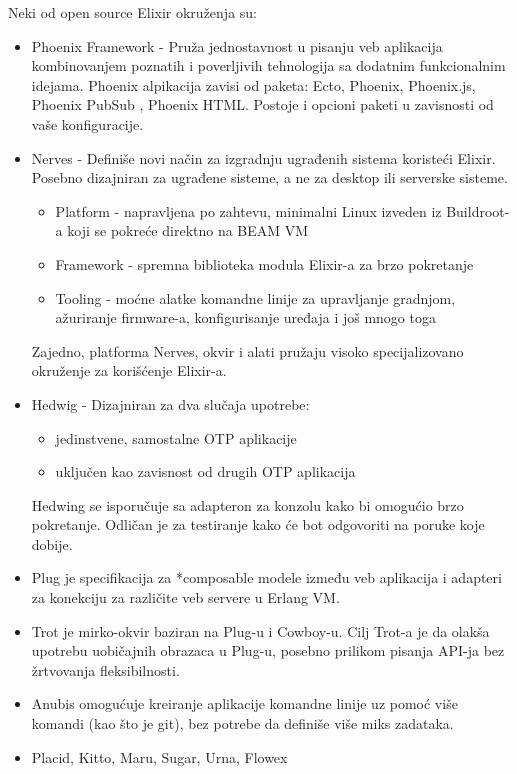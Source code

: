 \documentclass[a4paper]{article}
\begin{document}
Neki od open source Elixir okruženja su:
\begin{itemize}
    \item Phoenix Framework - Pruža jednostavnost u pisanju veb aplikacija kombinovanjem poznatih i poverljivih tehnologija sa dodatnim funkcionalnim idejama. Phoenix alpikacija zavisi od paketa: Ecto, Phoenix, Phoenix.js, Phoenix PubSub , Phoenix HTML. Postoje i opcioni paketi u zavisnosti od vaše konfiguracije.

    \item Nerves - Definiše novi način za izgradnju ugrađenih sistema koristeći Elixir. Posebno dizajniran za ugrađene sisteme, a ne za desktop ili serverske sisteme. 
    \begin{itemize}
        \item Platform - napravljena po zahtevu, minimalni Linux izveden iz Buildroot-a koji se pokreće direktno na BEAM VM
        \item Framework - spremna biblioteka modula Elixir-a za brzo pokretanje
        \item Tooling - moćne alatke komandne linije za upravljanje gradnjom, ažuriranje firmware-a, konfigurisanje uređaja i još mnogo toga
    \end{itemize}
    Zajedno, platforma Nerves, okvir i alati pružaju visoko specijalizovano okruženje za korišćenje Elixir-a.
    \item Hedwig - Dizajniran za dva slučaja upotrebe: 
    \begin{itemize}
        \item jedinstvene, samostalne OTP aplikacije
        \item uključen kao zavisnost od drugih OTP aplikacija
    \end{itemize}
    Hedwing se isporučuje sa adapteron za konzolu kako bi omogućio brzo pokretanje. Odličan je za testiranje kako će bot odgovoriti na poruke koje dobije.
    \item Plug je specifikacija za *composable modele između veb aplikacija i adapteri za konekciju za različite veb servere u Erlang VM.
    \item Trot je mirko-okvir baziran na Plug-u i Cowboy-u. Cilj Trot-a je da olakša upotrebu uobičajnih obrazaca u Plug-u, posebno prilikom pisanja API-ja bez žrtvovanja fleksibilnosti.
     \item Anubis omogućuje kreiranje aplikacije komandne linije uz pomoć više komandi (kao što je git), bez potrebe da definiše više miks zadataka. 
    \item Placid, Kitto, Maru, Sugar, Urna, Flowex
\end{itemize}
\end{document}
